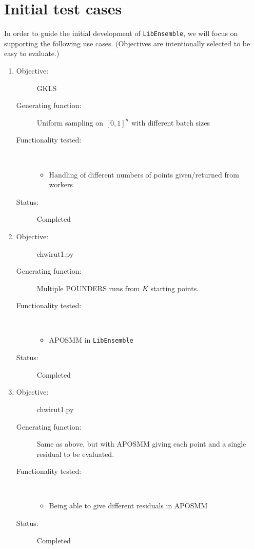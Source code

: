 \documentclass{article}
\newcommand{\libE}{\texttt{LibEnsemble}\xspace}
\begin{document}
\section{Initial test cases}
In order to guide the initial development of \libE, we will focus on supporting the following use cases. (Objectives are intentionally selected to be easy to evaluate.)
\begin{enumerate}
  \item 
    \begin{description}
      \item[Objective:] GKLS
      \item[Generating function:] Uniform sampling on $[0,1]^n$ with different batch sizes
      \item[Functionality tested:] \
        \begin{itemize}
          \item Handling of different numbers of points given/returned from workers
        \end{itemize}
      \item[Status:] Completed
    \end{description}
    \bigskip
  \item 
    \begin{description}
      \item[Objective:] chwirut1.py
      \item[Generating function:] Multiple POUNDERS runs from $K$ starting points.
      \item[Functionality tested:] \
        \begin{itemize}
          \item APOSMM in \libE
        \end{itemize}
      \item[Status:] Completed
    \end{description}
    \bigskip
  \item 
    \begin{description}
      \item[Objective:] chwirut1.py
      \item[Generating function:] Same as above, but with APOSMM giving each point and a single residual to be evaluated.
      \item[Functionality tested:] \
        \begin{itemize}
          \item Being able to give different residuals in APOSMM 
        \end{itemize}
      \item[Status:] Completed

\end{description}
\end{enumerate}
\end{document}
